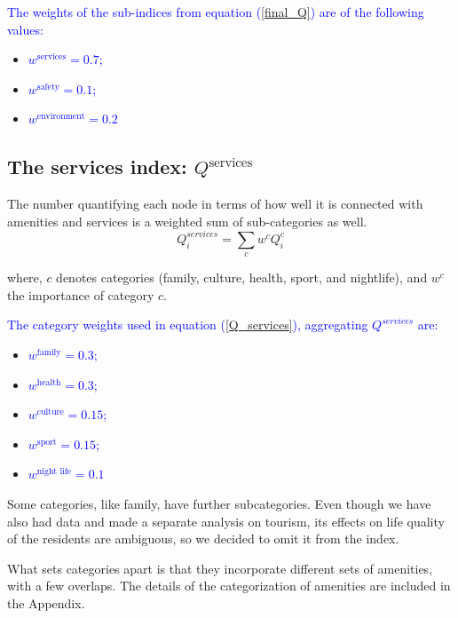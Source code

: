 \textcolor{blue}{The weights of the sub-indices from equation (\ref{final_Q}) are of the following values:}

\begin{itemize}
  \item \textcolor{blue}{$w^{\text{services}}=0.7$;}
  \item \textcolor{blue}{$w^{\text{safety}}=0.1$;}
  \item \textcolor{blue}{$w^{\text{environment}}=0.2$}
\end{itemize}

\subsection{The services index: \texorpdfstring{$Q^{\text{services}}$}{Q\^services}}
The number quantifying each node in terms of how well it is connected with amenities and services is a weighted sum of sub-categories as well.
\begin{equation}\label{Q_services}
	Q_i^{services} =\sum_c w^c Q_i^c
\end{equation}

where, $c$ denotes categories (family, culture, health, sport, and nightlife), and $w^c$ the importance of category $c$. %

\textcolor{blue}{The category weights used in equation (\ref{Q_services}), aggregating $Q^{services}$ are:}

\begin{itemize}
  \item \textcolor{blue}{$w^{\text{family}}= 0.3$;}
  \item \textcolor{blue}{$w^{\text{health}}= 0.3$;}
  \item \textcolor{blue}{$w^{\text{culture}} = 0.15$;}
  \item \textcolor{blue}{$w^{\text{sport}} = 0.15$;}
  \item \textcolor{blue}{$w^{\text{night life}}=0.1$}
\end{itemize}

Some categories, like family, have further subcategories. Even though we have also had data and made a separate analysis on tourism, its effects on life quality of the residents are ambiguous, so we decided to omit it from the index.

What sets categories apart is that they incorporate different sets of amenities, with a few overlaps. The details of the categorization of amenities are included in the Appendix.

